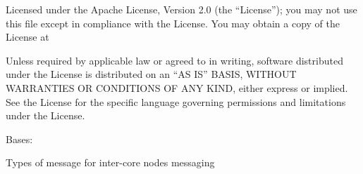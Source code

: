 \documentclass[letterpaper,10pt,english]{sphinxmanual}
\begin{document}
Licensed under the Apache License, Version 2.0 (the “License”);
you may not use this file except in compliance with the License.
You may obtain a copy of the License at
\begin{quote}

\end{quote}

Unless required by applicable law or agreed to in writing, software
distributed under the License is distributed on an “AS IS” BASIS,
WITHOUT WARRANTIES OR CONDITIONS OF ANY KIND, either express or implied.
See the License for the specific language governing permissions and
limitations under the License.

\begin{fulllineitems}
\label{\detokenize{bbc1.core.message_key_types:bbc1.core.message_key_types.InfraMessageCategory}}
Bases: 

Types of message for inter-core nodes messaging

\begin{fulllineitems}
\label{\detokenize{bbc1.core.message_key_types:bbc1.core.message_key_types.InfraMessageCategory.CATEGORY_DATA}}
\end{fulllineitems}


\begin{fulllineitems}
\label{\detokenize{bbc1.core.message_key_types:bbc1.core.message_key_types.InfraMessageCategory.CATEGORY_DOMAIN0}}
\end{fulllineitems}


\begin{fulllineitems}
\label{\detokenize{bbc1.core.message_key_types:bbc1.core.message_key_types.InfraMessageCategory.CATEGORY_NETWORK}}
\end{fulllineitems}


\end{fulllineitems}
\end{document}
